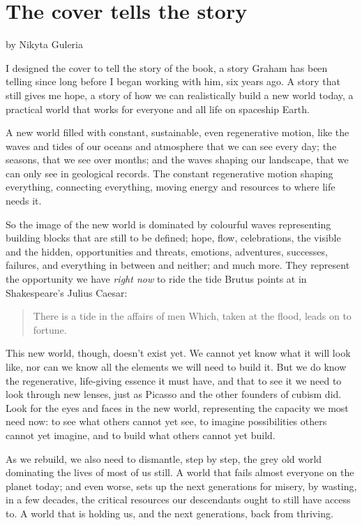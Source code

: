 ﻿\chapter{The cover tells the story}
\vspace{-2cm}
\begin{center} 
by Nikyta Guleria
\end{center}
\vspace{2cm}


I designed the cover to tell the story of the book, a story Graham has been telling since long before I began working with him, six years ago. A story that still gives me hope, a story of how we can realistically build a new world today, a practical world that works for everyone and all life on spaceship Earth. 


A new world filled with constant, sustainable, even regenerative motion, like the waves and tides of our oceans and atmosphere that we can see every day; the seasons, that we see over months; and the waves shaping our landscape, that we can only see in geological records. The constant regenerative motion shaping everything, connecting everything, moving energy and resources to where life needs it. 


So the image of the new world is dominated by colourful waves representing building blocks that are still to be defined; hope, flow, celebrations, the visible and the hidden, opportunities and threats, emotions, adventures, successes, failures, and everything in between and neither; and much more. They represent the opportunity we have \emph{right now} to ride the tide Brutus points at in Shakespeare’s Julius Caesar: \begin{quote}There is a tide in the affairs of men \newline Which, taken at the flood, leads on to fortune.\end{quote}


This new world, though, doesn’t exist yet. We cannot yet know what it will look like, nor can we know all the elements we will need to build it. But we do know the regenerative, life-giving essence it must have, and that to see it we need to look through new lenses, just as Picasso and the other founders of cubism did. Look for the eyes and faces in the new world, representing the capacity we most need now: to see what others cannot yet see, to imagine possibilities others cannot yet imagine, and to build what others cannot yet build. 


As we rebuild, we also need to dismantle, step by step, the grey old world dominating the lives of most of us still. A world that fails almost everyone on the planet today; and even worse, sets up the next generations for misery, by wasting,  in a few decades, the critical resources our descendants ought to still have access to. A world that is holding us, and the next generations, back from thriving.


